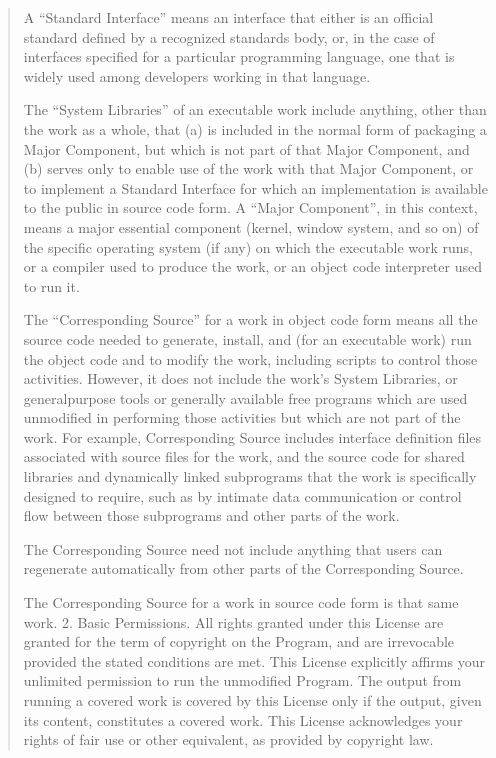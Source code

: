 \documentclass[letterpaper,10pt,english]{sphinxmanual}
\begin{document}
\begin{quote}
A “Standard Interface” means an interface that either is an official standard defined by a recognized standards body, or, in the case of interfaces specified for a particular programming language, one that is widely used among developers working in that language.

The “System Libraries” of an executable work include anything, other than the work as a whole, that (a) is included in the normal form of packaging a Major Component, but which is not part of that Major Component, and (b) serves only to enable use of the work with that Major Component, or to implement a Standard Interface for which an implementation is available to the public in source code form. A “Major Component”, in this context, means a major essential component (kernel, window system, and so on) of the specific operating system (if any) on which the executable work runs, or a compiler used to produce the work, or an object code interpreter used to run it.

The “Corresponding Source” for a work in object code form means all the source code needed to generate, install, and (for an executable work) run the object code and to modify the work, including scripts to control those activities. However, it does not include the work’s System Libraries, or general\sphinxhyphen{}purpose tools or generally available free programs which are used unmodified in performing those activities but which are not part of the work. For example, Corresponding Source includes interface definition files associated with source files for the work, and the source code for shared libraries and dynamically linked subprograms that the work is specifically designed to require, such as by intimate data communication or control flow between those subprograms and other parts of the work.

The Corresponding Source need not include anything that users can regenerate automatically from other parts of the Corresponding Source.

The Corresponding Source for a work in source code form is that same work.
2. Basic Permissions.
All rights granted under this License are granted for the term of copyright on the Program, and are irrevocable provided the stated conditions are met. This License explicitly affirms your unlimited permission to run the unmodified Program. The output from running a covered work is covered by this License only if the output, given its content, constitutes a covered work. This License acknowledges your rights of fair use or other equivalent, as provided by copyright law.


\end{quote}
\end{document}
